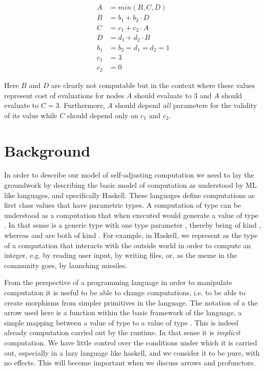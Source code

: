 \begin{align*}
A &= min(B, C, D) \\
B &= b_1 + b_2 \cdot D \\
C &= c_1 + c_2 \cdot A \\
D &= d_1 + d_2 \cdot B \\
b_1 &= b_2 = d_1 = d_2 = 1 \\
c_1 &= 3 \\
c_2 &= 0
\end{align*}

Here \(B\) and \(D\) are clearly not computable but in the context
where these values represent cost of evaluations for nodes \(A\)
should evaluate to 3 and \(A\) should evaluate to \(C =
3\). Furthermore, \(A\) should depend \emph{all} parameters for the
validity of its value while \(C\) should depend only on \(c_1\) and
\(c_2\).


\section{Background}

In order to describe our model of self-adjusting computation we need
to lay the groundwork by describing the basic model of computation as
understood by ML like languages, and specifically Haskell. These
languages define computations as first class values that have
parametric types. A computation of type  can be understood
as a computation that when executed would generate a value of type
. In that sense  is a generic type with one type
parameter , thereby being of kind \hask{* -> *}, whereas
 and  are both of kind \hask{*}. For example,
in Haskell, we represent as  the type of a computation
that interacts with the outside world in order to compute an integer,
e.g. by reading user input, by writing files, or, as the meme in the
community goes, by launching missiles.

From the perspective of a programming language in order to manipulate
computation it is useful to be able to change computations, i.e. to be
able to create morphisms  from simpler primitives in the
language. The notation of a the arrow \hask{->} used here is a function
within the basic framework of the language, a simple mapping between a
value of type  to a value of type . This is indeed already
computation carried out by the runtime.  In that sense it is
\emph{implicit} computation. We have little control over the
conditions under which it is carried out, especially in a lazy
language like haskell, and we consider it to be pure, with no
effects. This will become important when we discuss arrows and
profunctors.


